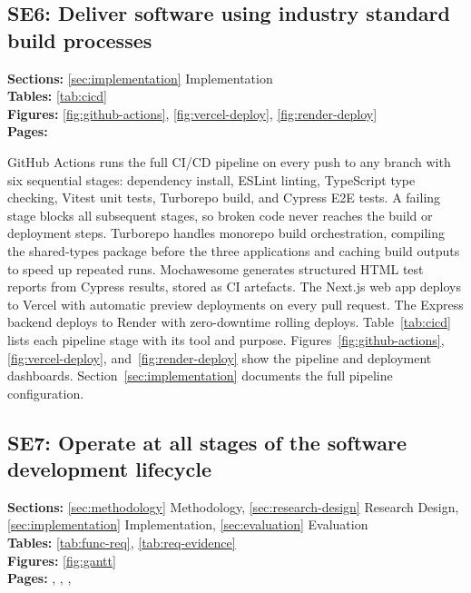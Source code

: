 \subsection*{SE6: Deliver software using industry standard build processes}

\noindent\textbf{Sections:} \ref{sec:implementation} Implementation\\
\noindent\textbf{Tables:} \ref{tab:cicd}\\
\noindent\textbf{Figures:} \ref{fig:github-actions}, \ref{fig:vercel-deploy}, \ref{fig:render-deploy}\\
\noindent\textbf{Pages:} \pageref{sec:implementation}

GitHub Actions runs the full CI/CD pipeline on every push to any branch with six sequential stages: dependency install, ESLint linting, TypeScript type checking, Vitest unit tests, Turborepo build, and Cypress E2E tests. A failing stage blocks all subsequent stages, so broken code never reaches the build or deployment steps. Turborepo handles monorepo build orchestration, compiling the shared-types package before the three applications and caching build outputs to speed up repeated runs. Mochawesome generates structured HTML test reports from Cypress results, stored as CI artefacts. The Next.js web app deploys to Vercel with automatic preview deployments on every pull request. The Express backend deploys to Render with zero-downtime rolling deploys. Table~\ref{tab:cicd} lists each pipeline stage with its tool and purpose. Figures~\ref{fig:github-actions}, \ref{fig:vercel-deploy}, and~\ref{fig:render-deploy} show the pipeline and deployment dashboards. Section~\ref{sec:implementation} documents the full pipeline configuration.

\subsection*{SE7: Operate at all stages of the software development lifecycle}

\noindent\textbf{Sections:} \ref{sec:methodology} Methodology, \ref{sec:research-design} Research Design, \ref{sec:implementation} Implementation, \ref{sec:evaluation} Evaluation\\
\noindent\textbf{Tables:} \ref{tab:func-req}, \ref{tab:req-evidence}\\
\noindent\textbf{Figures:} \ref{fig:gantt}\\
\noindent\textbf{Pages:} \pageref{sec:methodology}, \pageref{sec:research-design}, \pageref{sec:implementation}, \pageref{sec:evaluation}

